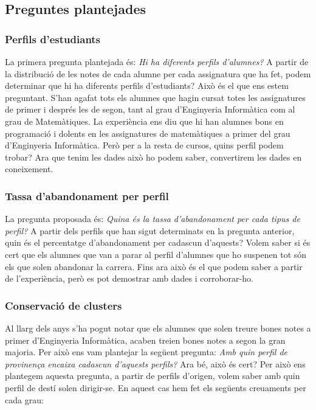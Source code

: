 \documentclass[12pt,a4paper,catalan]{article}
\begin{document}
\subsection{Preguntes plantejades}
\label{subsec:preguntesplantejades}
\subsubsection{Perfils d'estudiants}
La primera pregunta plantejada és: \textit{Hi ha diferents perfils d'alumnes?} A partir de la distribució de les notes de cada alumne per cada assignatura que ha fet, podem determinar que hi ha diferents perfils d'estudiants? Això és el que ens estem preguntant. S'han agafat tots els alumnes que hagin cursat totes les assignatures de primer i després les de segon, tant al grau d'Enginyeria Informàtica com al grau de Matemàtiques. La experiència ens diu que hi han alumnes bons en programació i dolents en les assignatures de matemàtiques a primer del grau d'Enginyeria Informàtica. Però per a la resta de cursos, quins perfil podem trobar? Ara que tenim les dades això ho podem saber, convertirem les dades en coneixement.

\subsubsection{Tassa d'abandonament per perfil}
La pregunta proposada és: \textit{Quina és la tassa d'abandonament per cada tipus de perfil?} A partir dels perfils que han sigut determinats en la pregunta anterior, quin és el percentatge d'abandonament per cadascun d'aquests? Volem saber si és cert que els alumnes que van a parar al perfil d'alumnes que ho suspenen tot són els que solen abandonar la carrera. Fins ara això és el que podem saber a partir de l'experiència, però es pot demostrar amb dades i corroborar-ho.

\subsubsection{Conservació de clusters}
Al llarg dels anys s'ha pogut notar que els alumnes que solen treure bones notes a primer d'Enginyeria Informàtica, acaben treien bones notes a segon la gran majoria. Per això ens vam plantejar la següent pregunta: \textit{Amb quin perfil de provinença encaixa cadascun d'aquests perfils?} Ara bé, això és cert? Per això ens plantegem aquesta pregunta, a partir de perfils d'origen, volem saber amb quin perfil de destí solen dirigir-se. En aquest cas hem fet els següents creuaments per cada grau:
\end{document}
